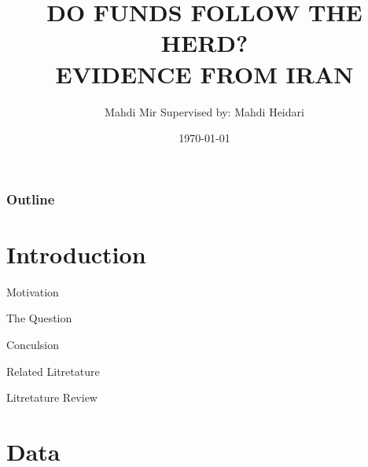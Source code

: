 \documentclass{beamer}
\title[]{\MakeUppercase{Do Funds Follow the Herd? \\ Evidence from Iran}}
\subtitle{}
\author[]{Mahdi Mir \newline Supervised by: Mahdi Heidari}
\institute[TeIAS]{Tehran Institute for Advanced Studies}
\date[TeIAS]{\today}
\begin{document}

\begin{frame}
    \titlepage{}
\end{frame}


\begin{frame}[label=toc]
    \frametitle{Outline}
    \tableofcontents{}
\end{frame}



\section{Introduction}



\begin{frame}{Motivation}


\end{frame}


\begin{frame}{The Question}

\end{frame}


\begin{frame}{Conculsion}


\end{frame}



\begin{frame}{Related Litretature}



\end{frame}


\begin{frame}{Litretature Review}



\end{frame}



\section{Data}
\end{document}

